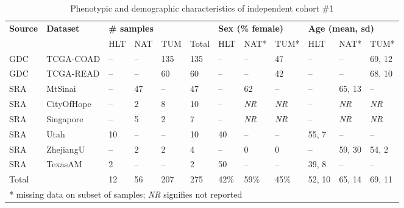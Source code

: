 \begin{table}[ht]
    \small
    \centering
    \caption{Phenotypic and demographic characteristics of independent cohort \#1}
    \label{tab:ind1}
    \begin{tabular}{ll|llll|lll|lll}
        \textbf{Source} & \textbf{Dataset} & \multicolumn{4}{l|}{\textbf{\# samples}} & \multicolumn{3}{l|}{\textbf{Sex (\% female)}} & \multicolumn{3}{l}{\textbf{Age (mean, sd)}} \\
        \cline{3-12}
         & & HLT & NAT & TUM & Total & HLT & NAT* & TUM* & HLT & NAT* & TUM* \\
        \hline
        GDC & TCGA-COAD & -- & -- & 135 & 135 & -- & -- & 47 & -- & -- & 69, 12 \\
        GDC & TCGA-READ & -- & -- & 60 & 60 & -- & -- & 42 & -- & -- & 68, 10 \\
        SRA & MtSinai & -- & 47 & -- & 47 & -- & 62 & -- & -- & 65, 13 & -- \\
        SRA & CityOfHope & -- & 2 & 8 & 10 & -- & \emph{NR} & \emph{NR} & -- & \emph{NR} & \emph{NR} \\
        SRA & Singapore & -- & 5 & 2 & 7 & -- & \emph{NR} & \emph{NR} & -- & \emph{NR} & \emph{NR} \\
        SRA & Utah & 10 & -- & -- & 10 & 40 & -- & -- & 55, 7 & -- & -- \\
        SRA & ZhejiangU & -- & 2 & 2 & 4 & -- & 0 & 0 & -- & 59, 30 & 54, 2 \\
        SRA & TexasAM & 2 & -- & -- & 2 & 50 & -- & -- & 39, 8 & -- & -- \\
        \hline
        Total &  & 12 & 56 & 207 & 275 & 42\% & 59\% & 45\% & 52, 10 & 65, 14 & 69, 11 \\
        \hline
        \multicolumn{12}{l}{* missing data on subset of samples; \emph{NR} signifies not reported} \\
    \end{tabular}
\end{table}

